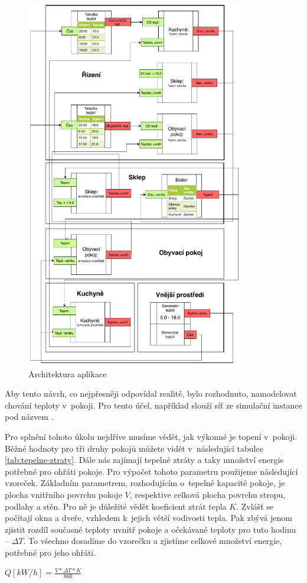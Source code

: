 \begin{figure}[htb]
 \centering
 \includegraphics[width=0.85\textwidth]{obrazky-figures/boiler-net.pdf}
 \caption{Architektura aplikace}
 \label{boiler-net}
\end{figure}

Aby tento návrh, co nejpřesněji odpovídal realitě, bylo rozhodnuto, namodelovat chování teploty v~pokoji. Pro tento účel, například slouží síť ze simulační instance  pod názvem .

Pro splnění tohoto úkolu nejdříve musíme vědět, jak výkonné je topení v~pokoji. Běžné hodnoty pro tři druhy pokojů můžete vidět v~následující tabulce \ref{tab:tepelne-ztraty}. Dále nás zajímají tepelné ztráty a taky množství energie potřebné pro ohřáti pokoje. Pro výpočet tohoto parametru použijeme následující vzoreček. Základním parametrem, rozhodujícím o~tepelné kapacitě pokoje, je plocha vnitřního povrchu pokoje $V$, respektive celková plocha povrchu stropu, podlahy a stěn. Pro ně je důležité vědět koeficient ztrát tepla $K$. Zvlášť se počítají okna a dveře, vzhledem k~jejich větší vodivosti tepla. Pak zbývá jenom zjistit rozdíl současné teploty uvnitř pokoje a očekávané teploty pro tuto hodinu -- $\Delta{T}$. To všechno dosadíme do vzorečku a zjistíme celkové množství energie, potřebné pro jeho ohřáti. \cite{tep_calc}
\begin{center}
 $Q[kW/h] = \frac{V*\Delta{T}*K}{860}$
\end{center}

